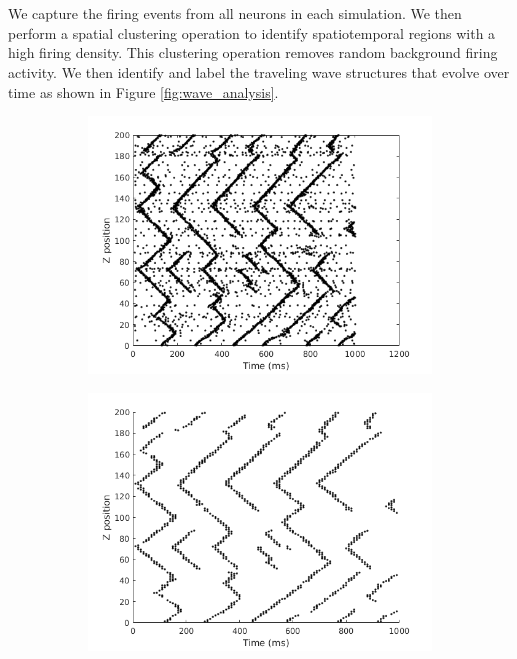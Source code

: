 \documentclass[a4paper,11pt]{article}
\begin{document}
\\ \\
We capture the firing events from all neurons in each simulation.
We then perform a spatial clustering operation to identify spatiotemporal regions with a high firing density.
This clustering operation removes random background firing activity.
We then identify and label the traveling wave structures that evolve over time as shown in Figure \ref{fig:wave_analysis}.
\begin{figure}[!htb]
 \centering
 \begin{subfigure}{0.33\textwidth}
  \centering
  \includegraphics[width=\textwidth]{fig/2x2_firings}
 \end{subfigure}%
 \begin{subfigure}{0.33\textwidth}
  \centering
  \includegraphics[width=\textwidth]{fig/2x2_density_filter}

\end{subfigure}
\end{figure}
\end{document}
